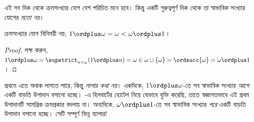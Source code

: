 \documentclass[../../../include/open-logic-section]{subfiles}
\begin{document}
এই সব দিক থেকে ক্রমসংখ্যার যোগ বেশ পরিচিত মনে হবে।
কিন্তু একটি গুরুত্বপূর্ণ দিক থেকে তা স্বাভাবিক সংখ্যার যোগের
\emph{মতো নয়}।

\begin{prop}
ক্রমসংখ্যার যোগ {বিনিময়ী নয়};
$1 \ordplus \omega = \omega < \omega \ordplus 1$।
\end{prop}

\begin{proof}
লক্ষ করুন, $1 \ordplus \omega = \supstrict_{n < \omega}
(1 \ordplus n) = \omega \in \omega \cup \{\omega\} =
\ordsucc{\omega} = \omega \ordplus 1$।
\end{proof}
\noindent
প্রথমে এতে অবাক লাগতে পারে, কিন্তু \emph{লাগার কথা নয়}।
একদিকে, $1 \ordplus \omega$-তে সব স্বাভাবিক সংখ্যার
\emph{আগে} একটি বাড়তি উপাদান বসানো হচ্ছে।
-এ হিলবার্টের হোটেল
নিয়ে যেভাবে যুক্তি করেছি, তাতে স্বজ্ঞাগতভাবে এই প্রথম
উপাদানটি সামগ্রিক ক্রমপ্রকার বদলায় না। অন্যদিকে,
$\omega \ordplus 1$-তে সব স্বাভাবিক সংখ্যার
\emph{পরে} একটি বাড়তি উপাদান বসানো হচ্ছে।
সেটি সম্পূর্ণ ভিন্ন ব্যাপার!
\end{document}
